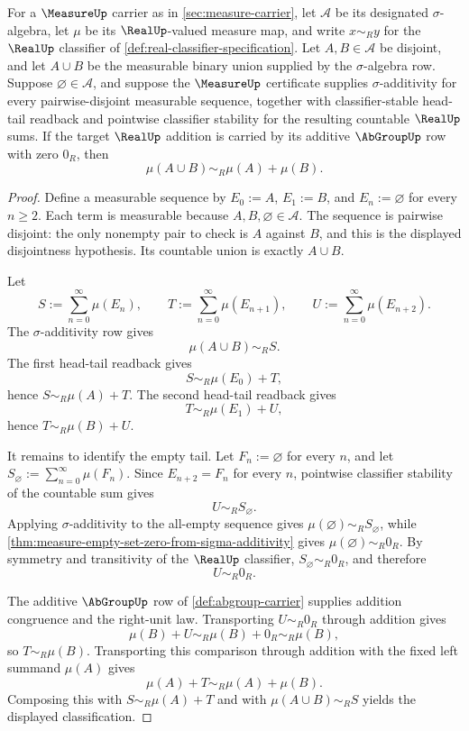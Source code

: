 \begin{theorem}
\label{thm:measure-finite-disjoint-union-additivity}
For a $\MeasureUp$ carrier as in \autoref{sec:measure-carrier}, let $\mathcal{A}$ be its designated $\sigma$-algebra, let $\mu$ be its $\RealUp$-valued measure map, and write $x\sim_R y$ for the $\RealUp$ classifier of \autoref{def:real-classifier-specification}. Let $A,B\in\mathcal{A}$ be disjoint, and let $A\cup B$ be the measurable binary union supplied by the $\sigma$-algebra row. Suppose $\varnothing\in\mathcal{A}$, and suppose the $\MeasureUp$ certificate supplies $\sigma$-additivity for every pairwise-disjoint measurable sequence, together with classifier-stable head-tail readback and pointwise classifier stability for the resulting countable $\RealUp$ sums. If the target $\RealUp$ addition is carried by its additive $\AbGroupUp$ row with zero $0_R$, then
$$
\mu(A\cup B)\sim_R\mu(A)+\mu(B).
$$
\end{theorem}
\begin{proof}
Define a measurable sequence by $E_0:=A$, $E_1:=B$, and $E_n:=\varnothing$ for every $n\geq2$. Each term is measurable because $A,B,\varnothing\in\mathcal{A}$. The sequence is pairwise disjoint: the only nonempty pair to check is $A$ against $B$, and this is the displayed disjointness hypothesis. Its countable union is exactly $A\cup B$.

Let
$$
S:=\sum_{n=0}^{\infty}\mu(E_n),\qquad
T:=\sum_{n=0}^{\infty}\mu(E_{n+1}),\qquad
U:=\sum_{n=0}^{\infty}\mu(E_{n+2}).
$$
The $\sigma$-additivity row gives
$$
\mu(A\cup B)\sim_R S.
$$
The first head-tail readback gives
$$
S\sim_R\mu(E_0)+T,
$$
hence $S\sim_R\mu(A)+T$. The second head-tail readback gives
$$
T\sim_R\mu(E_1)+U,
$$
hence $T\sim_R\mu(B)+U$.

It remains to identify the empty tail. Let $F_n:=\varnothing$ for every $n$, and let $S_{\varnothing}:=\sum_{n=0}^{\infty}\mu(F_n)$. Since $E_{n+2}=F_n$ for every $n$, pointwise classifier stability of the countable sum gives
$$
U\sim_R S_{\varnothing}.
$$
Applying $\sigma$-additivity to the all-empty sequence gives $\mu(\varnothing)\sim_R S_{\varnothing}$, while \autoref{thm:measure-empty-set-zero-from-sigma-additivity} gives $\mu(\varnothing)\sim_R0_R$. By symmetry and transitivity of the $\RealUp$ classifier, $S_{\varnothing}\sim_R0_R$, and therefore
$$
U\sim_R0_R.
$$

The additive $\AbGroupUp$ row of \autoref{def:abgroup-carrier} supplies addition congruence and the right-unit law. Transporting $U\sim_R0_R$ through addition gives
$$
\mu(B)+U\sim_R\mu(B)+0_R\sim_R\mu(B),
$$
so $T\sim_R\mu(B)$. Transporting this comparison through addition with the fixed left summand $\mu(A)$ gives
$$
\mu(A)+T\sim_R\mu(A)+\mu(B).
$$
Composing this with $S\sim_R\mu(A)+T$ and with $\mu(A\cup B)\sim_R S$ yields the displayed classification.
\end{proof}

